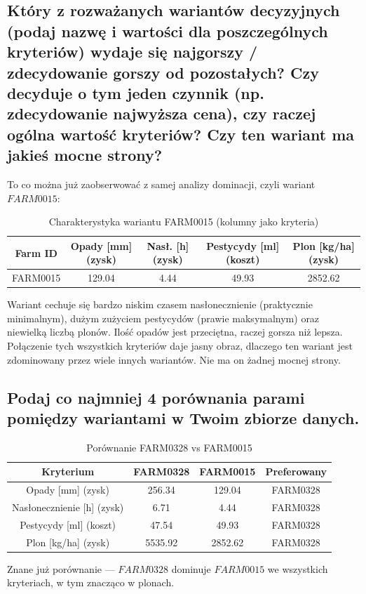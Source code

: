 \documentclass[11pt]{article}
\begin{document}
\subsection{Który z rozważanych wariantów decyzyjnych (podaj nazwę i wartości dla poszczególnych kryteriów) wydaje się najgorszy / zdecydowanie gorszy od pozostałych? Czy decyduje o tym jeden czynnik (np. zdecydowanie najwyższa cena), czy raczej ogólna wartość kryteriów? Czy ten wariant ma jakieś mocne strony?}
To co można już zaobserwować z samej analizy dominacji, czyli wariant $FARM0015$:
\begin{table}[H]
\centering
\caption{Charakterystyka wariantu FARM0015 (kolumny jako kryteria)}
\begin{tabular}{|c||c|c|c|c|}
\hline
\textbf{Farm ID} & \textbf{Opady [mm] (zysk)} & \textbf{Nasł. [h] (zysk)} & \textbf{Pestycydy [ml] (koszt)} & \textbf{Plon [kg/ha] (zysk)} \\
\hline
FARM0015 & 129.04 & 4.44 & 49.93 & 2852.62 \\
\hline
\end{tabular}
\end{table}

Wariant cechuje się bardzo niskim czasem nasłonecznienie (praktycznie minimalnym), dużym zużyciem pestycydów (prawie maksymalnym) oraz niewielką liczbą plonów. Ilość opadów jest przeciętna, raczej gorsza niż lepsza. Połączenie tych wszystkich kryteriów daje jasny obraz, dlaczego ten wariant jest zdominowany przez wiele innych wariantów. Nie ma on żadnej mocnej strony.

\subsection{Podaj co najmniej 4 porównania parami pomiędzy wariantami w Twoim zbiorze danych.}
\begin{table}[H]
\centering
\begin{tabular}{|c||c|c|c|}
\hline
\textbf{Kryterium} & \textbf{FARM0328} & \textbf{FARM0015} & \textbf{Preferowany} \\
\hline
Opady [mm] (zysk)           & 256.34 & 129.04 & FARM0328 \\ \hline
Nasłonecznienie [h] (zysk) & 6.71   & 4.44   & FARM0328 \\ \hline
Pestycydy [ml] (koszt)     & 47.54  & 49.93  & FARM0328 \\ \hline
Plon [kg/ha] (zysk)       & 5535.92& 2852.62& FARM0328 \\
\hline
\end{tabular}
\caption{Porównanie FARM0328 vs FARM0015}
\end{table}
Znane już porównanie --- $FARM0328$ dominuje $FARM0015$ we wszystkich kryteriach, w tym znacząco w plonach.
\end{document}
